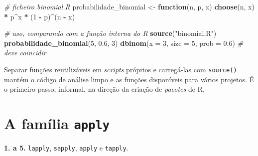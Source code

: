 \documentclass[
  portuguese,
  11pt,
  openany]{book}
\newenvironment{Shaded}{\begin{snugshade}}{\end{snugshade}}
\newcommand{\AttributeTok}[1]{\textcolor[rgb]{0.13,0.29,0.53}{#1}}
\newcommand{\CommentTok}[1]{\textcolor[rgb]{0.56,0.35,0.01}{\textit{#1}}}
\newcommand{\ControlFlowTok}[1]{\textcolor[rgb]{0.13,0.29,0.53}{\textbf{#1}}}
\newcommand{\DecValTok}[1]{\textcolor[rgb]{0.00,0.00,0.81}{#1}}
\newcommand{\FloatTok}[1]{\textcolor[rgb]{0.00,0.00,0.81}{#1}}
\newcommand{\FunctionTok}[1]{\textcolor[rgb]{0.13,0.29,0.53}{\textbf{#1}}}
\newcommand{\NormalTok}[1]{#1}
\newcommand{\OtherTok}[1]{\textcolor[rgb]{0.56,0.35,0.01}{#1}}
\newcommand{\SpecialCharTok}[1]{\textcolor[rgb]{0.81,0.36,0.00}{\textbf{#1}}}
\newcommand{\StringTok}[1]{\textcolor[rgb]{0.31,0.60,0.02}{#1}}
\begin{document}
\begin{Shaded}
\begin{Highlighting}[]
\CommentTok{\# ficheiro binomial.R}
\NormalTok{probabilidade\_binomial }\OtherTok{\textless{}{-}} \ControlFlowTok{function}\NormalTok{(n, p, x) }\FunctionTok{choose}\NormalTok{(n, x) }\SpecialCharTok{*}\NormalTok{ p}\SpecialCharTok{\^{}}\NormalTok{x }\SpecialCharTok{*}\NormalTok{ (}\DecValTok{1} \SpecialCharTok{{-}}\NormalTok{ p)}\SpecialCharTok{\^{}}\NormalTok{(n }\SpecialCharTok{{-}}\NormalTok{ x)}

\CommentTok{\# uso, comparando com a função interna do R}
\FunctionTok{source}\NormalTok{(}\StringTok{"binomial.R"}\NormalTok{)}
\FunctionTok{probabilidade\_binomial}\NormalTok{(}\DecValTok{5}\NormalTok{, }\FloatTok{0.6}\NormalTok{, }\DecValTok{3}\NormalTok{)}
\FunctionTok{dbinom}\NormalTok{(}\AttributeTok{x =} \DecValTok{3}\NormalTok{, }\AttributeTok{size =} \DecValTok{5}\NormalTok{, }\AttributeTok{prob =} \FloatTok{0.6}\NormalTok{)   }\CommentTok{\# deve coincidir}
\end{Highlighting}
\end{Shaded}

Separar funções reutilizáveis em \emph{scripts} próprios e carregá-las com \texttt{source()}
mantém o código de análise limpo e as funções disponíveis para vários projetos.
É o primeiro passo, informal, na direção da criação de \emph{pacotes} de R.

\section{\texorpdfstring{A família \texttt{apply}}{A família apply}}\label{a-famuxedlia-apply}

\textbf{1. a 5.} \texttt{lapply}, \texttt{sapply}, \texttt{apply} e \texttt{tapply}.

\begin{Shaded}
\end{Shaded}
\end{document}
